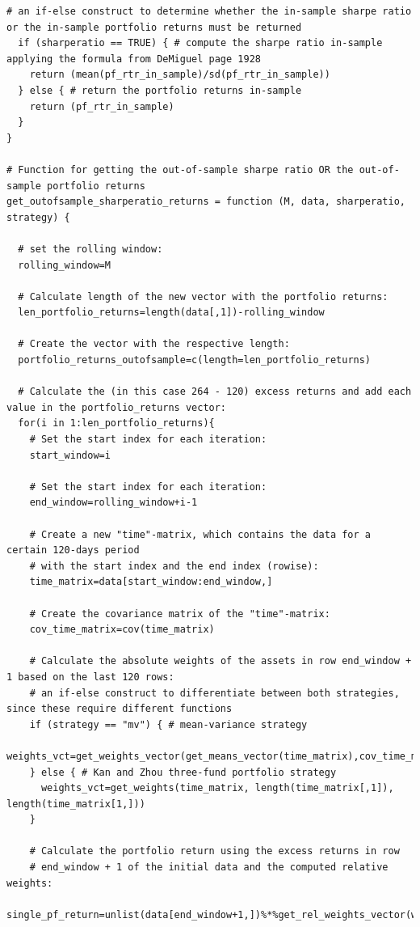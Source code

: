 \documentclass{article}
\begin{document}
\begin{lstlisting}[caption={This listing shows the entire code developed in R.}, label=code:1,frame=single]
  # an if-else construct to determine whether the in-sample sharpe ratio or the in-sample portfolio returns must be returned
  if (sharperatio == TRUE) { # compute the sharpe ratio in-sample applying the formula from DeMiguel page 1928
    return (mean(pf_rtr_in_sample)/sd(pf_rtr_in_sample)) 
  } else { # return the portfolio returns in-sample
    return (pf_rtr_in_sample)
  }
}

# Function for getting the out-of-sample sharpe ratio OR the out-of-sample portfolio returns
get_outofsample_sharperatio_returns = function (M, data, sharperatio, strategy) {
  
  # set the rolling window:
  rolling_window=M
  
  # Calculate length of the new vector with the portfolio returns:
  len_portfolio_returns=length(data[,1])-rolling_window
  
  # Create the vector with the respective length:
  portfolio_returns_outofsample=c(length=len_portfolio_returns)
  
  # Calculate the (in this case 264 - 120) excess returns and add each value in the portfolio_returns vector:
  for(i in 1:len_portfolio_returns){
    # Set the start index for each iteration:
    start_window=i
    
    # Set the start index for each iteration:
    end_window=rolling_window+i-1
    
    # Create a new "time"-matrix, which contains the data for a certain 120-days period
    # with the start index and the end index (rowise):
    time_matrix=data[start_window:end_window,]
    
    # Create the covariance matrix of the "time"-matrix:
    cov_time_matrix=cov(time_matrix)
    
    # Calculate the absolute weights of the assets in row end_window + 1 based on the last 120 rows:
    # an if-else construct to differentiate between both strategies, since these require different functions 
    if (strategy == "mv") { # mean-variance strategy
      weights_vct=get_weights_vector(get_means_vector(time_matrix),cov_time_matrix)
    } else { # Kan and Zhou three-fund portfolio strategy
      weights_vct=get_weights(time_matrix, length(time_matrix[,1]), length(time_matrix[1,]))
    }
    
    # Calculate the portfolio return using the excess returns in row 
    # end_window + 1 of the initial data and the computed relative weights:
    single_pf_return=unlist(data[end_window+1,])%*%get_rel_weights_vector(weights_vct)
    

\end{lstlisting}
\end{document}
